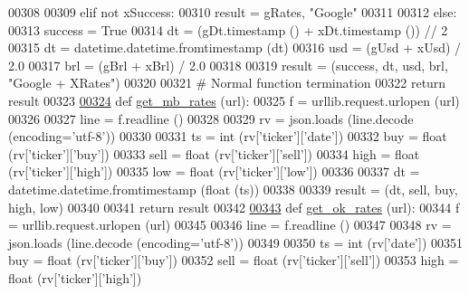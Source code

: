 \begin{DoxyCode}
{{{00308         
00309     \textcolor{keywordflow}{elif} \textcolor{keywordflow}{not} xSuccess:
00310         result = gRates, \textcolor{stringliteral}{"Google"}
00311         
00312     \textcolor{keywordflow}{else}: 
00313         success = \textcolor{keyword}{True}
00314         dt  = (gDt.timestamp () + xDt.timestamp ()) // 2
00315         dt = datetime.datetime.fromtimestamp (dt)
00316         usd = (gUsd + xUsd) / 2.0
00317         brl = (gBrl + xBrl) / 2.0
00318         
00319         result = (success, dt, usd, brl, \textcolor{stringliteral}{"Google + XRates"})
00320         
00321     \textcolor{comment}{# Normal function termination}
00322     \textcolor{keywordflow}{return} result        
00323 
\hypertarget{exch2exch_8py_source.tex_l00324}{}\hyperlink{namespaceexch2exch_a4226f3cef9fff15993d8b230a5cb92e4}{00324} \textcolor{keyword}{def }\hyperlink{namespaceexch2exch_a4226f3cef9fff15993d8b230a5cb92e4}{get\_mb\_rates} (url):
00325     f = urllib.request.urlopen (url)
00326     
00327     line = f.readline ()
00328     
00329     rv = json.loads (line.decode (encoding=\textcolor{stringliteral}{'utf-8'}))
00330     
00331     ts   = int   (rv[\textcolor{stringliteral}{'ticker'}][\textcolor{stringliteral}{'date'}])
00332     buy  = float (rv[\textcolor{stringliteral}{'ticker'}][\textcolor{stringliteral}{'buy'}])
00333     sell = float (rv[\textcolor{stringliteral}{'ticker'}][\textcolor{stringliteral}{'sell'}])
00334     high = float (rv[\textcolor{stringliteral}{'ticker'}][\textcolor{stringliteral}{'high'}])
00335     low  = float (rv[\textcolor{stringliteral}{'ticker'}][\textcolor{stringliteral}{'low'}])
00336     
00337     dt = datetime.datetime.fromtimestamp (float (ts))
00338     
00339     result = (dt, sell, buy, high, low)
00340     
00341     \textcolor{keywordflow}{return} result
00342 
\hypertarget{exch2exch_8py_source.tex_l00343}{}\hyperlink{namespaceexch2exch_a157dc1519ab4a24783fab8bf7db9c17e}{00343} \textcolor{keyword}{def }\hyperlink{namespaceexch2exch_a157dc1519ab4a24783fab8bf7db9c17e}{get\_ok\_rates} (url):
00344     f = urllib.request.urlopen (url)
00345     
00346     line = f.readline ()
00347     
00348     rv = json.loads (line.decode (encoding=\textcolor{stringliteral}{'utf-8'}))
00349     
00350     ts   = int   (rv[\textcolor{stringliteral}{'date'}])
00351     buy  = float (rv[\textcolor{stringliteral}{'ticker'}][\textcolor{stringliteral}{'buy'}])
00352     sell = float (rv[\textcolor{stringliteral}{'ticker'}][\textcolor{stringliteral}{'sell'}])
00353     high = float (rv[\textcolor{stringliteral}{'ticker'}][\textcolor{stringliteral}{'high'}])
}}}
\end{DoxyCode}
